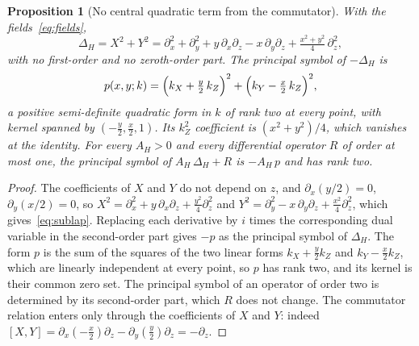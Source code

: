 \documentclass[11pt,a4paper]{article}
\newtheorem{proposition}[theorem]{Proposition}
\theoremstyle{definition}
\theoremstyle{remark}
\newcommand{\AH}{A_{H}}
\begin{document}
      \begin{proposition}[No central quadratic term from the commutator]\label{prop:source}
        With the fields~\eqref{eq:fields},
        \begin{equation}\label{eq:sublap}
          \Delta_H = X^2 + Y^2
          = \partial_x^2 + \partial_y^2 + y\,\partial_x\partial_z - x\,\partial_y\partial_z
          + \tfrac{x^2 + y^2}{4}\,\partial_z^2 ,
        \end{equation}
        with no first-order and no zeroth-order part.
        The principal symbol of $-\Delta_H$ is
        \begin{equation}\label{eq:symbol}
          p(x, y; k) = \Bigl(k_X + \tfrac{y}{2}\,k_Z\Bigr)^2 + \Bigl(k_Y - \tfrac{x}{2}\,k_Z\Bigr)^2 ,
        \end{equation}
        a positive semi-definite quadratic form in $k$ of rank two at every point, with kernel spanned by
        $(-\frac{y}{2}, \frac{x}{2}, 1)$.
        Its $k_Z^2$ coefficient is $(x^2 + y^2)/4$, which vanishes at the identity.
        For every $\AH > 0$ and every differential operator $R$ of order at most one, the principal symbol of
        $\AH\,\Delta_H + R$ is $-\AH\,p$ and has rank two.
      \end{proposition}

      \begin{proof}
        The coefficients of $X$ and $Y$ do not depend on $z$, and $\partial_x(y/2) = 0$, $\partial_y(x/2) = 0$, so
        $X^2 = \partial_x^2 + y\,\partial_x\partial_z + \frac{y^2}{4}\partial_z^2$ and
        $Y^2 = \partial_y^2 - x\,\partial_y\partial_z + \frac{x^2}{4}\partial_z^2$, which gives~\eqref{eq:sublap}.
        Replacing each derivative by $i$ times the corresponding dual variable in the second-order part gives
        $-p$ as the principal symbol of $\Delta_H$.
        The form $p$ is the sum of the squares of the two linear forms $k_X + \frac{y}{2}k_Z$ and
        $k_Y - \frac{x}{2}k_Z$, which are linearly independent at every point, so $p$ has rank two, and its kernel is
        their common zero set.
        The principal symbol of an operator of order two is determined by its second-order part, which $R$ does not
        change.
        The commutator relation enters only through the coefficients of $X$ and $Y$: indeed
        $[X, Y] = \partial_x(-\frac{x}{2})\partial_z - \partial_y(\frac{y}{2})\partial_z = -\partial_z$.
      \end{proof}
\end{document}
